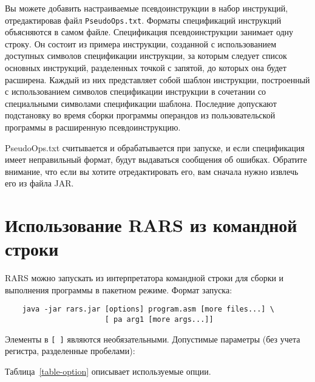 Вы можете добавить настраиваемые псевдоинструкции в набор инструкций, отредактировав файл \verb|PseudoOps.txt|. Форматы спецификаций инструкций объясняются в самом файле. Спецификация псевдоинструкции занимает одну строку. Он состоит из примера инструкции, созданной с использованием доступных символов спецификации инструкции, за которым следует список основных инструкций, разделенных точкой с запятой, до которых она будет расширена. Каждый из них представляет собой шаблон инструкции, построенный с использованием символов спецификации инструкции в сочетании со специальными символами спецификации шаблона. Последние допускают подстановку во время сборки программы операндов из пользовательской программы в расширенную псевдоинструкцию.

PseudoOps.txt считывается и обрабатывается при запуске, и если спецификация имеет неправильный формат, будут выдаваться сообщения об ошибках. Обратите внимание, что если вы хотите отредактировать его, вам сначала нужно извлечь его из файла JAR.

\section{Использование RARS из командной строки}

RARS можно запускать из интерпретатора командной строки для сборки и выполнения программы в пакетном режиме. Формат запуска:
\begin{verbatim}
    java -jar rars.jar [options] program.asm [more files...] \
                       [ pa arg1 [more args...]]
\end{verbatim}


Элементы в \verb|[ ]| являются необязательными. Допустимые параметры (без учета регистра, разделенные пробелами):

Таблица~\ref{table-option} описывает используемые опции.

